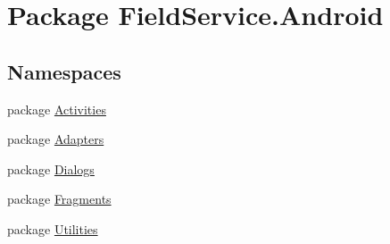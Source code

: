 \hypertarget{namespace_field_service_1_1_android}{\section{Package Field\+Service.\+Android}
\label{namespace_field_service_1_1_android}
}
\subsection*{Namespaces}
\begin{DoxyCompactItemize}
\item 
package \hyperlink{namespace_field_service_1_1_android_1_1_activities}{Activities}
\item 
package \hyperlink{namespace_field_service_1_1_android_1_1_adapters}{Adapters}
\item 
package \hyperlink{namespace_field_service_1_1_android_1_1_dialogs}{Dialogs}
\item 
package \hyperlink{namespace_field_service_1_1_android_1_1_fragments}{Fragments}
\item 
package \hyperlink{namespace_field_service_1_1_android_1_1_utilities}{Utilities}
\end{DoxyCompactItemize}
